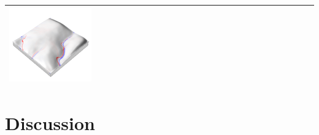 \documentclass[prodmode,acmtochi]{acmsmall} %
\begin{document}
\begin{table}
{\begin{tabular}{m{} m{} m{} m{}}
\includegraphics[width=0.3\textwidth]{images/render_3d/mean_depth_difference_5.png}\\
%
\bottomrule
\end{tabular}}
\label{table:water_flow_experiment} 
\end{table}


\pagebreak


\section{Discussion}









	





%
\end{document}
